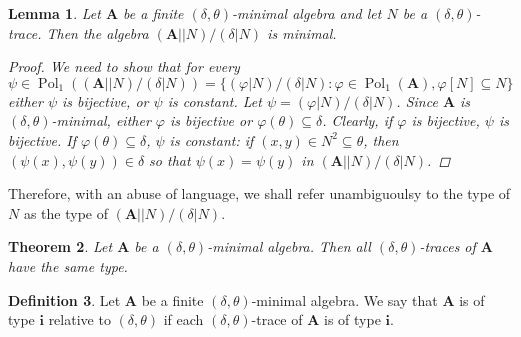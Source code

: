 \documentclass{amsart}
\theoremstyle{plain}
\newtheorem{theorem}{Theorem}[section]
\newtheorem{lemma}[theorem]{Lemma}
\theoremstyle{definition}
\newtheorem{definition}[theorem]{Definition}
\theoremstyle{remark}
\def\phi{\varphi}
\DeclareMathOperator{\Pol}{Pol}
\begin{document}
\begin{lemma}
    Let $\mathbf{A}$ be a finite $(\delta,\theta)$-minimal algebra and let $N$ be a $(\delta, \theta)$-trace. 
    Then the algebra $(\mathbf{A}||N)/(\delta|N)$ is minimal.
    \begin{proof}
        We need to show that for every 
        \begin{equation*}
            \psi \in \Pol_1((\mathbf{A}||N)/(\delta|N)) = \{ (\phi|N)/(\delta|N) : \phi \in \Pol_1(\mathbf{A}), \phi[N] \subseteq N\}
        \end{equation*}
        either $\psi$ is bijective, or $\psi$ is constant. 
        Let $\psi = (\phi|N)/(\delta|N)$. 
        Since $\mathbf{A}$ is $(\delta, \theta)$-minimal, either $\phi$ is bijective or $\phi(\theta) \subseteq \delta$. 
        Clearly, if $\phi$ is bijective, $\psi$ is bijective. 
        If $\phi(\theta) \subseteq \delta$, $\psi$ is constant: if $(x,y) \in N^2 \subseteq \theta$, then $(\psi(x), \psi(y)) \in \delta$ so that $\psi(x)=\psi(y)$ in $(\mathbf{A}||N)/(\delta|N)$.  
    \end{proof}  
\end{lemma}

Therefore, with an abuse of language, we shall refer unambiguoulsy to the type of $N$ as the type of $ (\mathbf{A}||N)/(\delta|N)$. 

\begin{theorem}
    Let $\mathbf{A}$ be a $(\delta, \theta)$-minimal algebra. 
    Then all $(\delta, \theta)$-traces of $\mathbf{A}$ have the same type.
\end{theorem}

\begin{definition}
    Let $\mathbf{A}$ be a finite $(\delta, \theta)$-minimal algebra. 
    We say that $\mathbf{A}$ is of type $\mathbf{i}$ relative to $(\delta, \theta)$ if each $(\delta, \theta)$-trace of $\mathbf{A}$ is of type $\mathbf{i}$. 
\end{definition}
\end{document}
